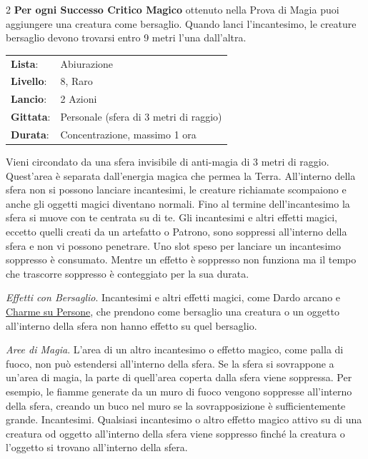 \begin{multicols}{2}
\textbf{Per ogni Successo Critico Magico} ottenuto nella Prova di Magia puoi aggiungere una creatura come bersaglio. Quando lanci l'incantesimo, le creature bersaglio devono trovarsi entro 9 metri l'una dall'altra.

\noindent\begin{tabularx}{\linewidth}{p{1.9cm}X}
	\rowcolor{gray!20}\textbf{Lista}: & Abiurazione \\
	\textbf{Livello}: & 8, Raro \\
	\rowcolor{gray!20}\textbf{Lancio}: & 2 Azioni \\
	\textbf{Gittata}: & Personale (sfera di 3 metri di raggio) \\
	\rowcolor{gray!20}\textbf{Durata}: & Concentrazione, massimo 1 ora \\
\end{tabularx}\smallskip

Vieni circondato da una sfera invisibile di anti-magia di 3 metri di raggio. Quest'area è separata dall'energia magica che permea la Terra. All'interno della sfera non si possono lanciare incantesimi, le creature richiamate scompaiono e anche gli oggetti magici diventano normali. Fino al termine dell'incantesimo la sfera si muove con te centrata su di te. Gli incantesimi e altri effetti magici, eccetto quelli creati da un artefatto o Patrono, sono soppressi all'interno della sfera e non vi possono penetrare. Uno slot speso per lanciare un incantesimo soppresso è consumato. Mentre un effetto è soppresso non funziona ma il tempo che trascorre soppresso è conteggiato per la sua durata.

\medskip

\noindent\emph{Effetti con Bersaglio}. Incantesimi e altri effetti magici, come Dardo arcano e \hyperlink{Charme su Persone}{Charme su Persone}, che prendono come bersaglio una creatura o un oggetto all'interno della sfera non hanno effetto su quel bersaglio.

\emph{Aree di Magia}. L'area di un altro incantesimo o effetto magico, come palla di fuoco, non può estendersi all'interno della sfera. Se la sfera si sovrappone a un'area di magia, la parte di quell'area coperta dalla sfera viene soppressa. Per esempio, le fiamme generate da un muro di fuoco vengono soppresse all'interno della sfera, creando un buco nel muro se la sovrapposizione è sufficientemente grande. Incantesimi. Qualsiasi incantesimo o altro effetto magico attivo su di una creatura od oggetto all'interno della sfera viene soppresso finché la creatura o l'oggetto si trovano all'interno della sfera.


\end{multicols}
